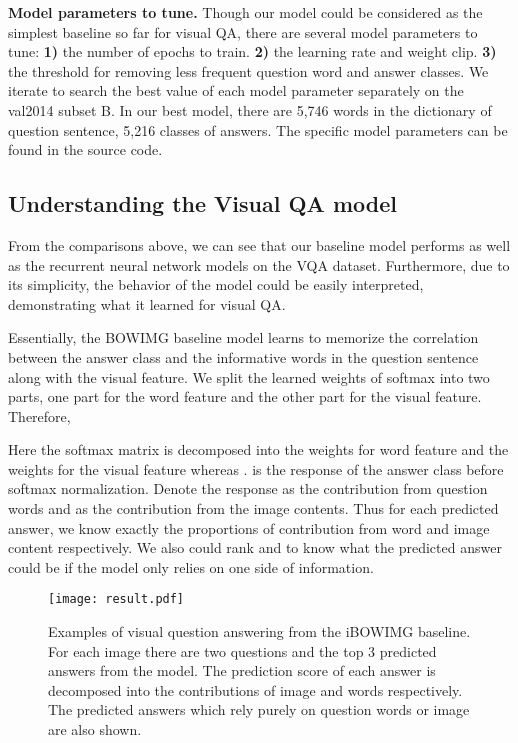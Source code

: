 \documentclass{article} \usepackage{nips14submit_e,times}
\begin{document}
\textbf{Model parameters to tune.} Though our model could be considered as the simplest baseline so far for visual QA, there are several model parameters to tune: \textbf{1)} the number of epochs to train. \textbf{2)} the learning rate and weight clip. \textbf{3)} the threshold for removing less frequent question word and answer classes. We iterate to search the best value of each model parameter separately on the val2014 subset B. In our best model, there are 5,746 words in the dictionary of question sentence, 5,216 classes of answers. The specific model parameters can be found in the source code.




\subsection{Understanding the Visual QA model}

From the comparisons above, we can see that our baseline model performs as well as the recurrent neural network models on the VQA dataset. Furthermore, due to its simplicity, the behavior of the model could be easily interpreted, demonstrating what it learned for visual QA. 

Essentially, the BOWIMG baseline model learns to memorize the correlation between the answer class and the informative words in the question sentence along with the visual feature. We split the learned weights of softmax into two parts, one part for the word feature and the other part for the visual feature. Therefore, 

Here the softmax matrix  is decomposed into the weights  for word feature  and the weights  for the visual feature  whereas .  is the response of the answer class before softmax normalization. Denote the response  as the contribution from question words and  as the contribution from the image contents. Thus for each predicted answer, we know exactly the proportions of contribution from word and image content respectively. We also could rank  and  to know what the predicted answer could be if the model only relies on one side of information. 

\begin{figure}
\begin{center}
\texttt{[image: result.pdf]}
\end{center}
\caption{Examples of visual question answering from the iBOWIMG baseline. For each image there are two questions and the top 3 predicted answers from the model. The prediction score of each answer is decomposed into the contributions of image and words respectively. The predicted answers which rely purely on question words or image are also shown.}\label{vqa_prediction}
\end{figure}
\end{document}
